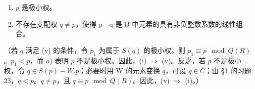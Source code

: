 \begin{enumerate}
\def\labelenumi{(\roman{enumi})}
\item
  \(p\) 是极小权。
\item
  不存在支配权 \(q \neq p\)，使得 p - q 是 B 中元素的具有非负整数系数的线性组合。
\end{enumerate}

（若 \(q\) 满足 (v) 的条件，令 \(p_1\) 为属于 \(S(q)\) 的极小权。则 \(p_1 \equiv p \mod Q(R)\)。\(p_1 < p\)，而 \(a\)) 表明 \(p\) 不是极小权。因此，(i) \(\Longrightarrow\) (v)。反之，若 \(p\) 不是极小权，令 \(q \in S(p) - W.p\)；必要时用 W 的元素变换 \(q\)，可设 \(q \in \overline{C}\)；由 §1 的习题 23，\(q < p\)。\(q \neq p\)，且 \(q \equiv p \mod Q(R)\)。因此，(v) \(\Longrightarrow\) (i)。）

